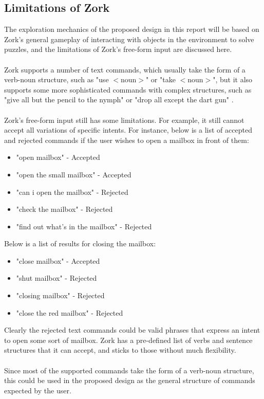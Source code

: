 \documentclass[12pt]{article}
\begin{document}
\subsection{Limitations of Zork}

The exploration mechanics of the proposed design in this report will be based on Zork's general gameplay of interacting with objects in the environment to solve puzzles, and the limitations of Zork's free-form input are discussed here.
\\
\\
Zork supports a number of text commands, which usually take the form of a verb-noun structure, such as "use $<$noun$>$" or "take $<$noun$>$", but it also supports some more sophisticated commands with complex structures, such as "give all but the pencil to the nymph" or "drop all except the dart gun" \cite{RefWorks:36}.
\\
\\
Zork's free-form input still has some limitations. For example, it still cannot accept all variations of specific intents. For instance, below is a list of accepted and rejected commands if the user wishes to open a mailbox in front of them:
\begin{itemize}
	\item "open mailbox" - Accepted
	\item "open the small mailbox" - Accepted
	\item "can i open the mailbox" - Rejected
	\item "check the mailbox" - Rejected
	\item "find out what's in the mailbox" - Rejected
\end{itemize}
Below is a list of results for closing the mailbox:
\begin{itemize}
	\item "close mailbox" - Accepted
	\item "shut mailbox" - Rejected
	\item "closing mailbox" - Rejected
	\item "close the red mailbox" - Rejected
\end{itemize}
Clearly the rejected text commands could be valid phrases that express an intent to open some sort of mailbox. Zork has a pre-defined list of verbs and sentence structures that it can accept, and sticks to those without much flexibility.
\\
\\
Since most of the supported commands take the form of a verb-noun structure, this could be used in the proposed design as the general structure of commands expected by the user.
\end{document}
